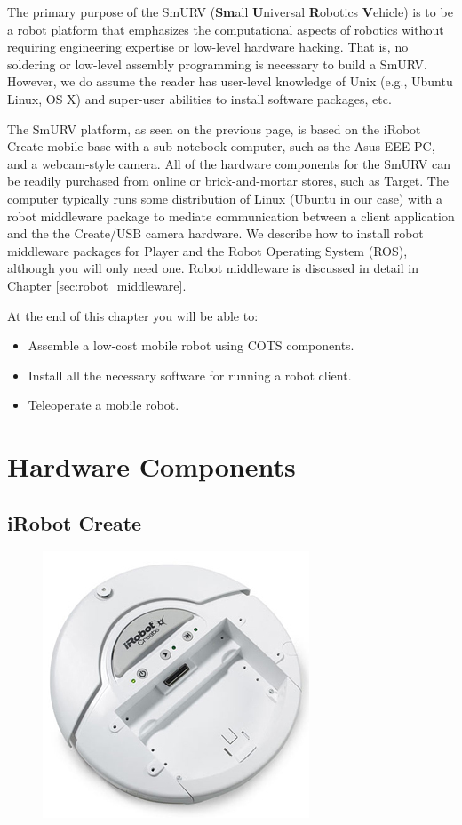 The primary purpose of the SmURV  ({\bf Sm}all {\bf U}niversal {\bf R}obotics {\bf V}ehicle) is to be a robot platform that emphasizes the computational aspects of robotics without requiring engineering expertise or low-level hardware hacking.  That is, no soldering or low-level assembly programming is necessary to build a SmURV.  However, we do assume the reader has user-level knowledge of Unix (e.g., Ubuntu Linux, OS X) and super-user abilities to install software packages, etc.

The SmURV platform, as seen on the previous page, is based on the iRobot Create mobile base with a sub-notebook computer, such as the Asus EEE PC, and a webcam-style camera.  All of the hardware components for the SmURV can be readily purchased from online or brick-and-mortar stores, such as Target.  The computer typically runs some distribution of Linux (Ubuntu in our case) with a robot middleware package to mediate communication between a client application and the the Create/USB camera hardware.  We describe how to install robot middleware packages for Player and the Robot Operating System (ROS), although you will only need one.  Robot middleware is discussed in detail in Chapter \ref{sec:robot_middleware}.

At the end of this chapter you will be able to:
\begin{itemize}
\item Assemble a low-cost mobile robot using COTS components.
\item Install all the necessary software for running a robot client.
\item Teleoperate a mobile robot.
\end{itemize}

\section{Hardware Components}

\subsection{iRobot Create}

\begin{figure}
\includegraphics[width=0.3\columnwidth]{figures/2_create_base.jpg}
\end{figure}

